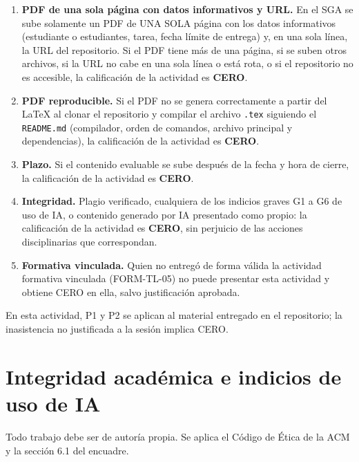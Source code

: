 \documentclass[11pt]{article}
\newcommand{\seccion}[1]{\section{\textcolor{utegreendk}{#1}}}
\begin{document}
\begin{cajapiso}[title={Criterios de piso: su incumplimiento implica calificación CERO en la actividad}]
	\begin{enumerate}[label=\textbf{P\arabic*.},leftmargin=24pt,itemsep=3pt]
		\item \textbf{PDF de una sola página con datos informativos y URL.} En el SGA se sube solamente un PDF de UNA SOLA página con los datos informativos (estudiante o estudiantes, tarea, fecha límite de entrega) y, en una sola línea, la URL del repositorio. Si el PDF tiene más de una página, si se suben otros archivos, si la URL no cabe en una sola línea o está rota, o si el repositorio no es accesible, la calificación de la actividad es \textbf{CERO}.
		\item \textbf{PDF reproducible.} Si el PDF no se genera correctamente a partir del \LaTeX{} al clonar el repositorio y compilar el archivo \texttt{.tex} siguiendo el \texttt{README.md} (compilador, orden de comandos, archivo principal y dependencias), la calificación de la actividad es \textbf{CERO}.
		\item \textbf{Plazo.} Si el contenido evaluable se sube después de la fecha y hora de cierre, la calificación de la actividad es \textbf{CERO}.
		\item \textbf{Integridad.} Plagio verificado, cualquiera de los indicios graves G1 a G6 de uso de IA, o contenido generado por IA presentado como propio: la calificación de la actividad es \textbf{CERO}, sin perjuicio de las acciones disciplinarias que correspondan.
		\item \textbf{Formativa vinculada.} Quien no entregó de forma válida la actividad formativa vinculada (FORM-TL-05) no puede presentar esta actividad y obtiene CERO en ella, salvo justificación aprobada.
	\end{enumerate}
	En esta actividad, P1 y P2 se aplican al material entregado en el repositorio; la inasistencia no justificada a la sesión implica CERO.
\end{cajapiso}

\seccion{Integridad académica e indicios de uso de IA}

Todo trabajo debe ser de autoría propia. Se aplica el Código de Ética de la ACM \citep{acm_code_2018} y la sección 6.1 del encuadre.
\end{document}
